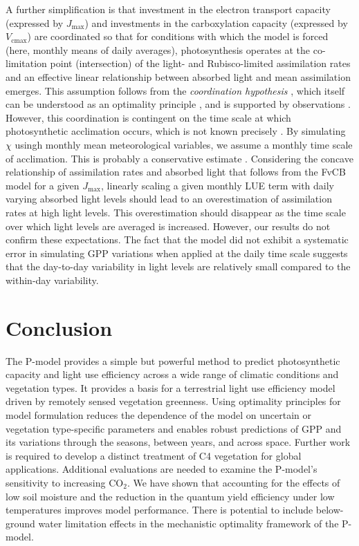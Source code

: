 \documentclass{myreport}
\newcommand{\coo}{CO$_2$}
\newcommand{\vcmax}{$V_{\text{cmax}}$}
\newcommand{\jmax}{$J_{\text{max}}$}
\begin{document}
A further simplification is that investment in the electron transport capacity (expressed by \jmax ) and investments in the carboxylation capacity (expressed by \vcmax ) are coordinated so that for conditions with which the model is forced (here, monthly means of daily averages), photosynthesis operates at the co-limitation point (intersection) of the light- and Rubisco-limited assimilation rates and an effective linear relationship between absorbed light and mean assimilation emerges. This assumption follows from the \textit{coordination hypothesis} \citep{chen93, haxeltine96}, which itself can be understood as an optimality principle \citep{haxeltine96}, and is supported by observations \citep{maire12po}. However, this coordination is contingent on the time scale at which photosynthetic acclimation occurs, which is not known precisely  \citep{smithdukes13gcb, way14}. By simulating $\chi$ usingh monthly mean meteorological variables, we assume a monthly time scale of acclimation. This is probably a conservative estimate \citep{smithdukes17, veres84}. Considering the concave relationship of assimilation rates and absorbed light that follows from the FvCB model for a given \jmax , linearly scaling a given monthly LUE term with daily varying absorbed light levels should lead to an overestimation of assimilation rates at high light levels. This overestimation should disappear as the time scale over which light levels are averaged is increased. However, our results do not confirm these expectations. The fact that the model did not exhibit a systematic error in simulating GPP variations when applied at the daily time scale suggests that the day-to-day variability in light levels are relatively small compared to the within-day variability.

\section{Conclusion}

The P-model provides a simple but powerful method to predict photosynthetic capacity and light use efficiency across a wide range of climatic conditions and vegetation types. It provides a basis for a terrestrial light use efficiency model driven by remotely sensed vegetation greenness. Using optimality principles for model formulation reduces the dependence of the model on uncertain or vegetation type-specific parameters and enables robust predictions of GPP and its variations through the seasons, between years, and across space. Further work is required to develop a distinct treatment of C4 vegetation for global applications. Additional evaluations are needed to examine the P-model's sensitivity to increasing \coo . We have shown that accounting for the effects of low soil moisture and the reduction in the quantum yield efficiency under low temperatures improves model performance. There is potential to include below-ground water limitation effects in the mechanistic optimality framework of the P-model. 
\end{document}

